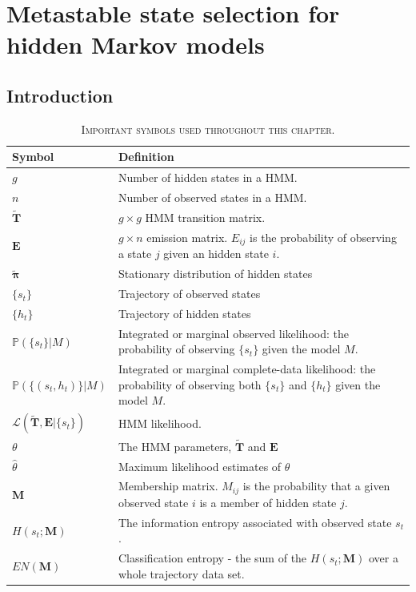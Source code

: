 \let\textcircled=\pgftextcircled
\chapter{Metastable state selection for hidden Markov models}
\label{chap:hmm}




\section{Introduction}
\begin{table}
    \centering
    \caption[Important symbols]{\textsc{Important symbols used throughout this chapter}.}
    \begin{tabularx}{0.9\textwidth}{ l >{\raggedright\arraybackslash}X } 
    \hline
    \textbf{Symbol}  &  \textbf{Definition} \\
    \hline\hline
    $g$ & Number of hidden states in a HMM. \\
    $n$ & Number of observed states in a HMM. \\
    $\mathbf{\tilde{T}}$ & $g\times g$ HMM transition matrix. \\
    $\mathbf{E}$ & $g \times n$ emission matrix. $E_{ij}$ is the probability of observing a state $j$ given an hidden state $i$. \\
    $\tilde{\bm{\pi}}$ & Stationary distribution of hidden states \\
    $\{s_{t}\}$ & Trajectory of observed states \\
    $\{h_{t}\}$ & Trajectory of hidden states \\
    $\mathbb{P}(\{s_t\}|M)$ & Integrated or marginal observed likelihood: the probability of observing $\{s_t\}$ given the model $M$. \\
    $\mathbb{P}(\{(s_t, h_t)\}|M)$ & Integrated or marginal complete-data likelihood: the probability of observing both $\{s_t\}$ and $\{h_t\}$ given the model $M$.  \\
    $\mathcal{L}\left(\tilde{\mathbf{T}}, \mathbf{E}| \{s_t\}\right)$ &  HMM likelihood. \\
    $\theta$ & The HMM parameters, $\tilde{\mathbf{T}}$ and $\mathbf{E}$\\
    $\hat{\theta}$ & Maximum likelihood estimates of $\theta$ \\
    $\mathbf{M}$ & Membership matrix. $M_{ij}$ is the probability that a given observed state $i$ is a member of hidden state $j$. \\
    $H(s_{t}; \mathbf{M})$ & The information entropy associated with observed state $s_{t}$. \\
    $EN(\mathbf{M})$ & Classification entropy - the sum of the $H(s_{t}; \mathbf{M})$ over a whole trajectory data set. \\
    \hline
    \end{tabularx}
    \label{tab:hmm_symbols}
\end{table}

